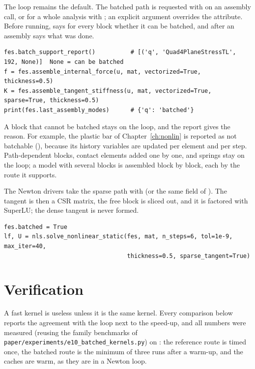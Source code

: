 The loop remains the default. The batched path is requested with  on an assembly call, or for a whole analysis with ; an explicit argument overrides the attribute. Before running,  says for every block whether it can be batched, and after an assembly  says what was done.

\begin{lstlisting}[caption={Requesting batched assembly and checking what was used (plate of \cbkChunkedPlateElems{} \texttt{Quad4PlaneStressTL} elements).},label={lst:bk-use}]
fes.batch_support_report()          # [('q', 'Quad4PlaneStressTL', 192, None)]  None = can be batched
f = fes.assemble_internal_force(u, mat, vectorized=True, thickness=0.5)
K = fes.assemble_tangent_stiffness(u, mat, vectorized=True, sparse=True, thickness=0.5)
print(fes.last_assembly_modes)      # {'q': 'batched'}
\end{lstlisting}

A block that cannot be batched stays on the loop, and the report gives the reason. For example, the plastic bar of Chapter~\ref{ch:nonlin} is reported as not batchable (\emph{\cbkReasonPlastic}), because its history variables are updated per element and per step. Path-dependent blocks, contact elements added one by one, and springs stay on the loop; a model with several blocks is assembled block by block, each by the route it supports.

The Newton drivers take the sparse path with  (or the same field of ). The tangent is then a CSR matrix, the free block is sliced out, and it is factored with SuperLU; the dense tangent is never formed.

\begin{lstlisting}[caption={A load-controlled Newton solve with batched assembly and a sparse tangent.},label={lst:bk-newton}]
fes.batched = True
lf, U = nls.solve_nonlinear_static(fes, mat, n_steps=6, tol=1e-9, max_iter=40,
                                   thickness=0.5, sparse_tangent=True)
\end{lstlisting}

\section{Verification}\label{sec:bk-verif}

A fast kernel is useless unless it is the same kernel. Every comparison below reports the agreement with the loop next to the speed-up, and all numbers were measured (reusing the family benchmarks of \texttt{paper/experiments/e10\_batched\_kernels.py}) on \machine{}: the reference route is timed once, the batched route is the minimum of three runs after a warm-up, and the caches are warm, as they are in a Newton loop.

